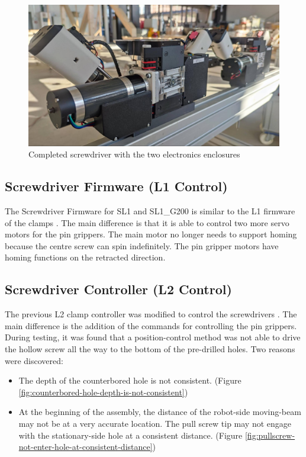 \begin{figure}[!h]
    \centering
    \includegraphics[width=\textwidth]{images/7a/img69.jpg}
    \caption{Completed screwdriver with the two electronics enclosures}
\label{fig:completed-clamp-with-electronics-enclosures}
\end{figure}

\FloatBarrier

\subsection{Screwdriver Firmware (L1 Control)}
\label{subsection:exploration-4-screwdriver-firmware-l1-control}

The Screwdriver Firmware for SL1 and SL1\_G200 is similar to the L1 firmware of the clamps . The main difference is that it is able to control two more servo motors for the pin grippers.
The main motor no longer needs to support homing because the centre screw can spin indefinitely. The pin gripper motors have homing functions on the retracted direction.

\subsection{Screwdriver Controller (L2 Control)}
\label{subsection:exploration-4-screwdriver-controller-l2-control}

The previous L2 clamp controller was modified to control the screwdrivers . The main difference is the addition of the commands for controlling the pin grippers. 
During testing, it was found that a position-control method was not able to drive the hollow screw all the way to the bottom of the pre-drilled holes. Two reasons were discovered: 
\begin{itemize}
    \item The depth of the counterbored hole is not consistent. (Figure \ref{fig:counterbored-hole-depth-is-not-consistent})
    \item At the beginning of the assembly, the distance of the robot-side moving-beam may not be at a very accurate location. The pull screw tip may not engage with the stationary-side hole at a consistent distance. (Figure \ref{fig:pullscrew-not-enter-hole-at-consistent-distance})
\end{itemize}

